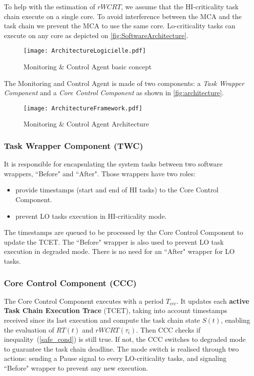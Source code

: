 \documentclass[french, a4paper, 11pt, twoside, pdftex]{StyleThese}
\begin{document}
To help with the estimation of $rWCRT$, we assume that the HI-criticality task chain execute on a single core. To avoid interference between the MCA and the task chain we prevent the MCA to use the same core. Lo-criticality tasks can execute on any core as depicted on \autoref{fig:SoftwareArchitecture}. 

\begin{figure}[ht]
            \centering
            \texttt{[image: ArchitectureLogicielle.pdf]}
            \caption{Monitoring \& Control Agent basic concept} \label{fig:SoftwareArchitecture}
\end{figure}

      The Monitoring and Control Agent is made of two components: a \emph{Task Wrapper Component} and a \emph{Core Control Component} as shown in \autoref{fig:architecture}.
        \begin{figure}[ht]
            \centering
            \texttt{[image: ArchitectureFramework.pdf]}
            \caption{Monitoring \& Control Agent Architecture\label{fig:architecture}}
        \end{figure}
        
        
        \subsubsection{Task Wrapper Component (TWC)} It is responsible for encapsulating the system tasks between two software wrappers, ``Before" and ``After". Those wrappers have two roles: \begin{itemize}
                \item provide timestamps (start and end of HI tasks) to the Core Control Component.
                \item prevent LO tasks execution in HI-criticality mode.
            \end{itemize}
            

        The timestamps are queued to be processed by the Core Control Component to update the TCET.
        The ``Before" wrapper is also used to prevent LO task execution in degraded mode. There is no need for an ``After" wrapper for LO tasks.

        \subsubsection{Core Control Component (CCC)}
           The Core Control Component executes with a period $T_{ccc}$. It updates each \textbf{active Task Chain Execution Trace} (TCET), taking into account timestamps received since its last execution and compute the task chain state $S(t)$, enabling the evaluation of $RT(t)$ and $rWCRT(\tau_i)$. Then CCC checks if inequality~(\ref{safe_cond}) is still true. If not, the CCC switches to degraded mode to guarantee the task chain deadline. The mode switch is realised through two actions: sending a Pause signal to every LO-criticality tasks, and signaling ``Before" wrapper to prevent any new execution.
        
\end{document}
